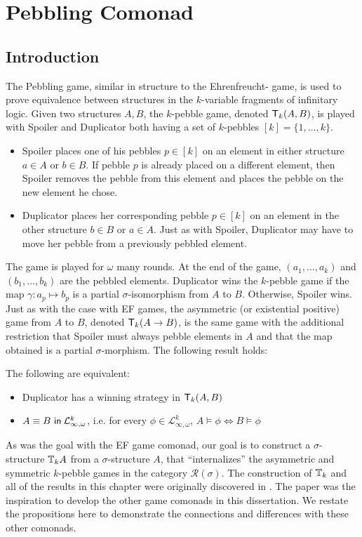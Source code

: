 \chapter{Pebbling Comonad}
\section{Introduction}
The Pebbling game, similar in structure to the Ehrenfreucht-{\Fraisse} game, is used to prove equivalence between structures in the $k$-variable fragments of infinitary logic. Given two structures $A,B$, the $k$-pebble game, denoted ${\mathsf{T}_{k}(A,B)}$, is played with Spoiler and Duplicator both having a set of $k$-pebbles $[k] = \{1,\dots,k\}$.  
\begin{itemize} 
\item Spoiler places one of his pebbles $p \in [k]$ on an element in either structure $a \in A$ or $b \in B$. If pebble $p$ is already placed on a different element, then Spoiler removes the pebble from this element and places the pebble on the new element he chose.  
\item Duplicator places her corresponding pebble $p \in [k]$ on an element in the other structure $b \in B$ or $a \in A$. Just as with Spoiler, Duplicator may have to move her pebble from a previously pebbled element.
\end{itemize} 
The game is played for $\omega$ many rounds. At the end of the game, $(a_{1},\dots,a_{k})$ and $(b_{1},\dots,b_{k})$ are the pebbled elements. Duplicator wins the $k$-pebble game if the map $\gamma:a_{p} \longmapsto b_{p}$ is a partial $\sigma$-isomorphism from $A$ to $B$. Otherwise, Spoiler wins. Just as with the case with EF games, the asymmetric (or existential positive) game from $A$ to $B$, denoted ${\mathsf{T}_{k}(A \rightarrow B)}$, is the same game with the additional restriction that Spoiler must always pebble elements in $A$ and that the map obtained is a partial $\sigma$-morphism. The following result holds:
\begin{prop}
The following are equivalent:
\begin{itemize}
\item Duplicator has a winning strategy in ${\mathsf{T}_{k}(A,B)}$
\item ${A \equiv B \ \mathsf{in}\: \mathcal{L}^{k}_{\infty,\omega}}$, i.e. for every $\phi \in \mathcal{L}^{k}_{\infty,\omega}$, $A \vDash \phi \Leftrightarrow B \vDash \phi$
\end{itemize}
\end{prop}
As was the goal with the EF game comonad, our goal is to construct a $\sigma$-structure ${\mathbb{T}_{k}A}$ from a $\sigma$-structure $A$, that ``internalizes'' the asymmetric and symmetric $k$-pebble games in the category $\mathcal{R}(\sigma)$. The construction of ${\mathbb{T}_{k}}$ and all of the results in this chapter were originally discovered in \cite{Abramsky2017}. The paper \cite{Abramsky2017} was the inspiration to develop the other game comonads in this dissertation. We restate the propositions here to demonstrate the connections and differences with these other comonads.  
